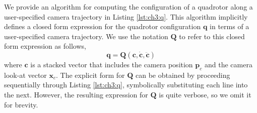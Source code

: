 \begin{Listing}[t]
\begin{algorithmic}[1]
{}


\end{algorithmic}
\end{Listing}

We provide an algorithm for computing the configuration of a quadrotor along a user-specified camera trajectory in Listing \ref{lst:ch3:q}.
This algorithm implicitly defines a closed form expression  for the quadrotor configuration $\mathbf{q}$ in terms of a user-specified camera trajectory.
We use the notation $\mathbf{Q}$ to refer to this closed form expression as follows,
%
\begin{equation}
\mathbf{q} = \mathbf{Q} (\mathbf{c},\dot{\mathbf{c}},\ddot{\mathbf{c}})
\label{eqn:ch3:q}
\end{equation}
%
where $\mathbf{c}$ is a stacked vector that includes the camera position $\mathbf{p}_c$ and the camera look-at vector $\mathbf{x}_c$.
The explicit form for $\mathbf{Q}$ can be obtained by proceeding sequentially through Listing \ref{lst:ch3:q}, symbolically substituting each line into the next.
However, the resulting expression for $\mathbf{Q}$ is quite verbose, so we omit it for brevity.


